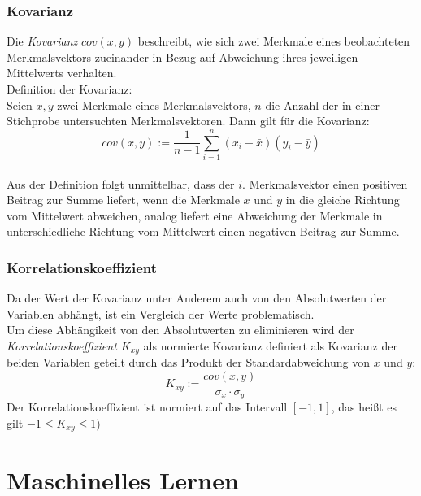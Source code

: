 \documentclass[a4paper]{scrartcl}
\begin{document}
\begin{multicols}{2}
                    \subsubsection{Kovarianz}
                        Die \emph{Kovarianz} $cov(x,y)$ beschreibt, wie sich zwei Merkmale eines beobachteten Merkmalsvektors zueinander in Bezug auf Abweichung ihres jeweiligen Mittelwerts verhalten. \cite{ertel2016}\\
                        Definition der Kovarianz:\\
                        Seien $x,y$ zwei Merkmale eines Merkmalsvektors, $n$ die Anzahl der in einer Stichprobe untersuchten Merkmalsvektoren. Dann gilt für die Kovarianz:
                        $$
                            cov(x,y) := \frac{1}{n-1}\sum_{i=1}^n(x_i - \bar{x})(y_i - \bar{y})
                        $$ \cite{kohn2005}\\
                        Aus der Definition folgt unmittelbar, dass der $i$. Merkmalsvektor einen positiven Beitrag zur Summe liefert, wenn die Merkmale $x$ und $y$ in die gleiche Richtung vom Mittelwert abweichen, analog liefert eine Abweichung der Merkmale in unterschiedliche Richtung vom Mittelwert einen negativen Beitrag zur Summe. \cite{ertel2016}

                    \subsubsection{Korrelationskoeffizient}
                        Da der Wert der Kovarianz unter Anderem auch von den Absolutwerten der Variablen abhängt, ist ein Vergleich der Werte problematisch.
                        \cite{ertel2016} \\
                        Um diese Abhängikeit von den Absolutwerten zu eliminieren wird der \emph{Korrelationskoeffizient $K_{xy}$} als normierte Kovarianz definiert als Kovarianz der beiden Variablen geteilt durch das Produkt der Standardabweichung von $x$ und $y$:
                        $$
                            K_{xy} := \frac{cov(x,y)}{\sigma_x \cdot \sigma_y} 
                        $$
                        Der Korrelationskoeffizient ist normiert auf das Intervall $[-1,1]$, das heißt es gilt $-1 \leq K_{xy} \leq 1)$
                        \cite{kohn2005}

        \section{Maschinelles Lernen}
            

\end{multicols}
\end{document}
